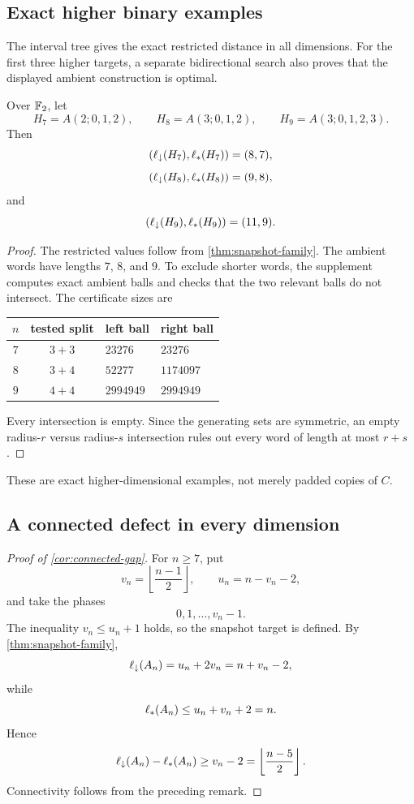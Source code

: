 \subsection{Exact higher binary examples}

The interval tree gives the exact restricted distance in all dimensions.  For the first three higher targets, a separate bidirectional search also proves that the displayed ambient construction is optimal.

\begin{theorem}\label{thm:higher-exact}
Over $\mathbb F_2$, let
\[
H_7=A(2;0,1,2),
\qquad
H_8=A(3;0,1,2),
\qquad
H_9=A(3;0,1,2,3).
\]
Then
\[
(\ell_{\downarrow}(H_7),\ell_{*}(H_7))=(8,7),
\]
\[
(\ell_{\downarrow}(H_8),\ell_{*}(H_8))=(9,8),
\]
and
\[
(\ell_{\downarrow}(H_9),\ell_{*}(H_9))=(11,9).
\]
\end{theorem}

\begin{proof}
The restricted values follow from \cref{thm:snapshot-family}.  The ambient words have lengths $7$, $8$, and $9$.  To exclude shorter words, the supplement computes exact ambient balls and checks that the two relevant balls do not intersect.  The certificate sizes are
\begin{center}
\begin{tabular}{@{}ccll@{}}
\toprule
$n$&tested split&left ball&right ball\\
\midrule
$7$&$3+3$&$23276$&$23276$\\
$8$&$3+4$&$52277$&$1174097$\\
$9$&$4+4$&$2994949$&$2994949$\\
\bottomrule
\end{tabular}
\end{center}
Every intersection is empty.  Since the generating sets are symmetric, an empty radius-$r$ versus radius-$s$ intersection rules out every word of length at most $r+s$.
\end{proof}

These are exact higher-dimensional examples, not merely padded copies of $C$.

\subsection{A connected defect in every dimension}

\begin{proof}[Proof of \cref{cor:connected-gap}]
For $n\ge7$, put
\[
v_n=\left\lfloor\frac{n-1}{2}\right\rfloor,
\qquad
u_n=n-v_n-2,
\]
and take the phases
\[
0,1,\ldots,v_n-1.
\]
The inequality $v_n\le u_n+1$ holds, so the snapshot target is defined.  By \cref{thm:snapshot-family},
\[
\ell_{\downarrow}(A_n)=u_n+2v_n=n+v_n-2,
\]
while
\[
\ell_{*}(A_n)\le u_n+v_n+2=n.
\]
Hence
\[
\ell_{\downarrow}(A_n)-\ell_{*}(A_n)
\ge v_n-2
=
\left\lfloor\frac{n-5}{2}\right\rfloor.
\]
Connectivity follows from the preceding remark.
\end{proof}

